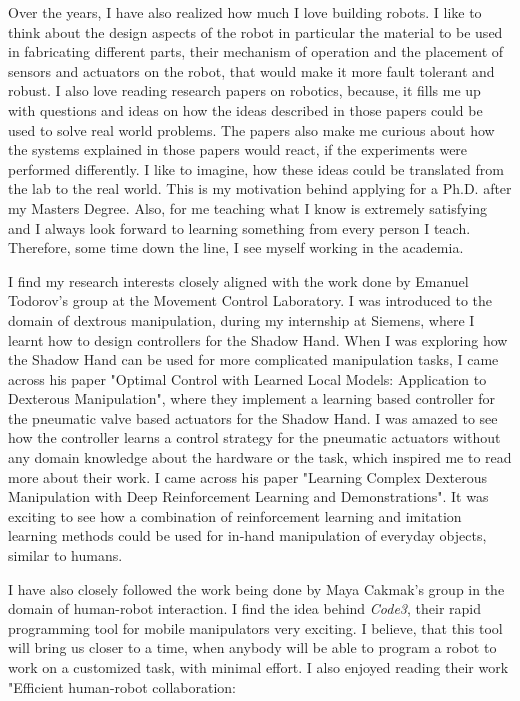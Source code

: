 \documentclass[11pt]{article}
\begin{document}
\par
\justify
 Over the years, I have also realized how much I love building robots. I like to think about the design aspects of the robot in particular the material to be used in fabricating different parts, their mechanism of operation and the placement of sensors and actuators on the robot, that would make it more fault tolerant and robust.  I also love reading research papers on robotics, because, it fills me up with questions and ideas on how the ideas described in those papers could be used to solve real world problems. The papers also make me curious about how the systems explained in those papers would react, if the experiments were performed differently. I like to imagine, how these ideas could be translated from the lab to the real world. This is my motivation behind applying for a Ph.D. after my Masters Degree. Also, for me teaching what I know is extremely satisfying and I always look forward to learning something from every person I teach. Therefore, some time down the line, I see myself working in the academia. 
\par
\justify
I find my research interests closely aligned with the work done by Emanuel Todorov's group at the Movement Control Laboratory. I was introduced to the domain of dextrous manipulation, during my internship at Siemens, where I learnt how to design controllers for the Shadow Hand. When I was exploring how the Shadow Hand can be used for more complicated manipulation tasks, I came across his paper "Optimal Control with Learned Local Models: Application to Dexterous Manipulation", where they implement a learning based controller for the pneumatic valve based actuators for the Shadow Hand. I was amazed to see how the controller learns a control strategy for the pneumatic actuators without any domain knowledge about the hardware or the task, which inspired me to read more about their work. I came across his paper "Learning Complex Dexterous Manipulation with Deep Reinforcement Learning and Demonstrations". It was exciting to see how a combination of reinforcement learning and imitation learning methods could be used for in-hand manipulation of everyday objects, similar to humans. 
\par
\justify
I have also closely followed the work being done by Maya Cakmak's group in the domain of human-robot interaction. I find the idea behind \textit{Code3}, their rapid programming tool for mobile manipulators very exciting. I believe, that this tool will bring us closer to a time, when anybody will be able to program a robot to work on a customized task, with minimal effort. I also enjoyed reading their work "Efficient human-robot collaboration:
\end{document}
